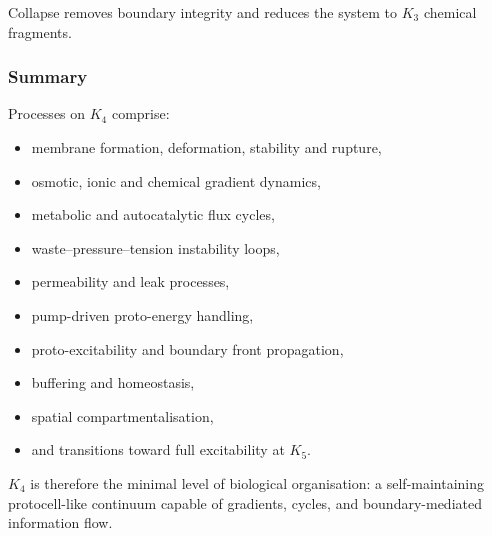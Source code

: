 Collapse removes boundary integrity and reduces the system to $K_3$ 
chemical fragments.

\subsubsection{Summary}

Processes on $K_4$ comprise:
\begin{itemize}
    \item membrane formation, deformation, stability and rupture,
    \item osmotic, ionic and chemical gradient dynamics,
    \item metabolic and autocatalytic flux cycles,
    \item waste–pressure–tension instability loops,
    \item permeability and leak processes,
    \item pump-driven proto-energy handling,
    \item proto-excitability and boundary front propagation,
    \item buffering and homeostasis,
    \item spatial compartmentalisation,
    \item and transitions toward full excitability at $K_5$.
\end{itemize}

$K_4$ is therefore the minimal level of biological organisation: a 
self-maintaining protocell-like continuum capable of gradients, cycles, 
and boundary-mediated information flow.
